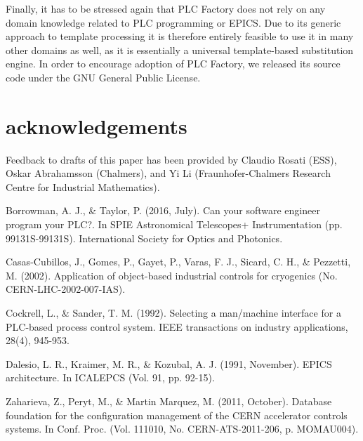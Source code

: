 \documentclass[a4paper,
              ]{jacow}
\begin{document}
Finally, it has to be stressed again that PLC Factory does not rely on any domain knowledge related to PLC programming or EPICS. Due to its generic approach to template processing it is therefore entirely feasible to use it in many other domains as well, as it is essentially a universal template-based substitution engine. In order to encourage adoption of PLC Factory, we released its source code under the GNU General Public License.

\section{acknowledgements}
Feedback to drafts of this paper has been provided by Claudio Rosati (ESS), Oskar Abrahamsson (Chalmers), and Yi Li (Fraunhofer-Chalmers Research Centre for Industrial Mathematics).


\begin{thebibliography}{9} %

 Borrowman, A. J., \& Taylor, P. (2016, July). Can your software engineer program your PLC?. In SPIE Astronomical Telescopes+ Instrumentation (pp. 99131S-99131S). International Society for Optics and Photonics.

 Casas-Cubillos, J., Gomes, P., Gayet, P., Varas, F. J., Sicard, C. H., \& Pezzetti, M. (2002). Application of object-based industrial controls for cryogenics (No. CERN-LHC-2002-007-IAS).

 Cockrell, L., \& Sander, T. M. (1992). Selecting a man/machine interface for a PLC-based process control system. IEEE transactions on industry applications, 28(4), 945-953.

 Dalesio, L. R., Kraimer, M. R., \& Kozubal, A. J. (1991, November). EPICS architecture. In ICALEPCS (Vol. 91, pp. 92-15).


 Zaharieva, Z., Peryt, M., \& Martin Marquez, M. (2011, October). Database foundation for the configuration management of the CERN accelerator controls systems. In Conf. Proc. (Vol. 111010,  No. CERN-ATS-2011-206, p. MOMAU004).

\end{thebibliography}
\null  %
\end{document}
